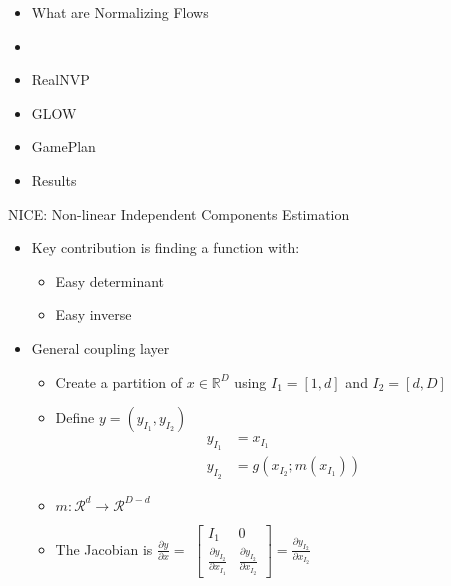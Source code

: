 \begin{frame}
\begin{itemize}
    \item What are Normalizing Flows
    \item \textbf{\color{red}{NICE}}
    \item RealNVP
    \item GLOW
    \item GamePlan
    \item Results
\end{itemize}
\end{frame}

\begin{frame}{NICE: Non-linear Independent Components Estimation}
\begin{itemize}
    \item Key contribution is finding a function with:
    \begin{itemize}
        \item Easy determinant
        \item Easy inverse
    \end{itemize}
    \item General coupling layer
    \begin{itemize}
        \item Create a partition of $x \in \mathbb{R}^D$ using $I_1 = [1, d]$ and $I_2 = [d, D]$
        \item Define $y = (y_{I_1}, y_{I_2})$
            \begin{align*}
                y_{I_1} &= x_{I_1} \\
                y_{I_2} &= g(x_{I_2}; m(x_{I_1}))
            \end{align*}
        \item $m : \mathcal{R}^d \longrightarrow \mathcal{R}^{D-d}$
        \item The Jacobian is $\frac{\partial y}{\partial x} =$
        $\begin{bmatrix}
            I_1 & 0 \\
            \frac{\partial y_{I_2}}{\partial x_{I_1}} &  \frac{\partial y_{I_2}}{\partial x_{I_2}}
        \end{bmatrix} = \frac{\partial y_{I_2}}{\partial x_{I_2}}$ 
    \end{itemize}
\end{itemize}
\end{frame}
